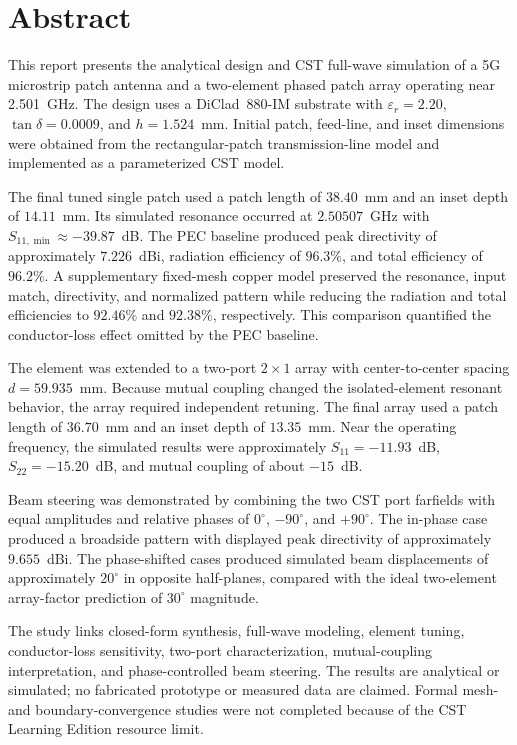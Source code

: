 
\chapter*{Abstract}
\thispagestyle{fancy}
\begingroup
\setlength{\emergencystretch}{2em}

This report presents the analytical design and CST full-wave simulation of a 5G microstrip patch
antenna and a two-element phased patch array operating near 2.501~GHz. The design uses a
DiClad~880-IM substrate with $\varepsilon_r=2.20$, $\tan\delta=0.0009$, and
$h=1.524$~mm. Initial patch, feed-line, and inset dimensions were obtained from the
rectangular-patch transmission-line model and implemented as a parameterized CST model.

The final tuned single patch used a patch length of $38.40$~mm and an inset depth of $14.11$~mm.
Its simulated resonance occurred at $2.50507$~GHz with $S_{11,\min}\approx-39.87$~dB. The
PEC baseline produced peak directivity of approximately $7.226$~dBi, radiation efficiency of
$96.3\%$, and total efficiency of $96.2\%$. A supplementary fixed-mesh copper model preserved
the resonance, input match, directivity, and normalized pattern while reducing the radiation and
total efficiencies to $92.46\%$ and $92.38\%$, respectively. This comparison quantified the
conductor-loss effect omitted by the PEC baseline.

The element was extended to a two-port $2\times1$ array with center-to-center spacing
$d=59.935$~mm. Because mutual coupling changed the isolated-element resonant behavior, the array
required independent retuning. The final array used a patch length of $36.70$~mm and an inset
depth of $13.35$~mm. Near the operating frequency, the simulated results were approximately
$S_{11}=-11.93$~dB, $S_{22}=-15.20$~dB, and mutual coupling of about $-15$~dB.

Beam steering was demonstrated by combining the two CST port farfields with equal amplitudes and
relative phases of $0^\circ$, $-90^\circ$, and $+90^\circ$. The in-phase case produced a broadside
pattern with displayed peak directivity of approximately $9.655$~dBi. The phase-shifted cases
produced simulated beam displacements of approximately $20^\circ$ in opposite half-planes,
compared with the ideal two-element array-factor prediction of $30^\circ$ magnitude.

The study links closed-form synthesis, full-wave modeling, element tuning, conductor-loss
sensitivity, two-port characterization, mutual-coupling interpretation, and phase-controlled beam
steering. The results are analytical or simulated; no fabricated prototype or measured data are
claimed. Formal mesh- and boundary-convergence studies were not completed because of the CST
Learning Edition resource limit.
\par\endgroup
